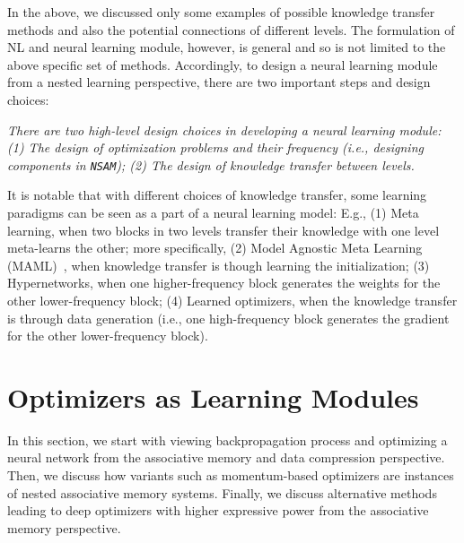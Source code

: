 \documentclass{article}
\newcommand{\citep}{\parencite}
\newcommand{\head}[1]{\vspace{1.7mm}\noindent{{\textcolor{c4}{\bf #1.}}}}
\newcommand{\nsam}{\texttt{NSAM}}
\begin{document}
\head{A Note on Designing Neural Learning Modules} 
In the above, we discussed only some examples of possible knowledge transfer methods and also the potential connections of different levels. The formulation of NL and neural learning module, however, is general and so is not limited to the above specific set of methods. Accordingly, to design a neural learning module from a nested learning perspective, there are two important steps and design choices:

\begin{myboxi}
    \textit{There are two high-level design choices in developing a neural learning module: (1) The design of optimization problems and their frequency (i.e., designing components in \nsam); (2) The design of knowledge transfer between levels.}
\end{myboxi}
It is notable that with different choices of knowledge transfer, some learning paradigms can be seen as a part of a neural learning model: E.g., (1) Meta learning, when two blocks in two levels transfer their knowledge with one level meta-learns the other; more specifically, (2) Model Agnostic Meta Learning (MAML)~\citep{finn2017model}, when knowledge transfer is though learning the initialization; (3) Hypernetworks, when one higher-frequency block generates the weights for the other lower-frequency block; (4) Learned optimizers, when the knowledge transfer is through data generation (i.e., one high-frequency block generates the gradient for the other lower-frequency block).

\section{Optimizers as Learning Modules}\label{sec:DeepOptimizers}
In this section, we start with viewing backpropagation process and optimizing a neural network from the associative memory and data compression perspective. Then, we discuss how variants such as momentum-based optimizers are instances of nested associative memory systems. Finally, we discuss alternative methods leading to deep optimizers with higher expressive power from the associative memory perspective. 
\end{document}
